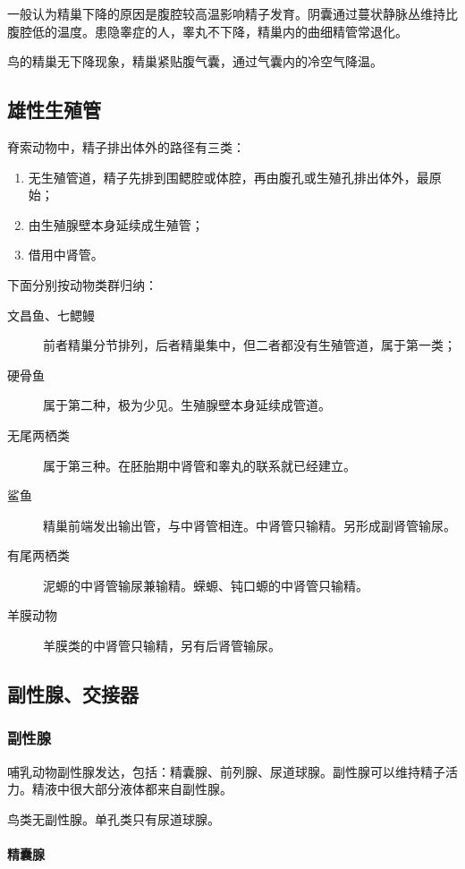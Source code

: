 一般认为精巢下降的原因是腹腔较高温影响精子发育。阴囊通过蔓状静脉丛维持比腹腔低的温度。患隐睾症的人，睾丸不下降，精巢内的曲细精管常退化。

鸟的精巢无下降现象，精巢紧贴腹气囊，通过气囊内的冷空气降温。

\subsection{雄性生殖管}

脊索动物中，精子排出体外的路径有三类：
\begin{enumerate}
	\item 无生殖管道，精子先排到围鳃腔或体腔，再由腹孔或生殖孔排出体外，最原始；
	\item 由生殖腺壁本身延续成生殖管；
	\item 借用中肾管。
\end{enumerate}

下面分别按动物类群归纳：
\begin{description}
	\item[文昌鱼、七鳃鳗] 前者精巢分节排列，后者精巢集中，但二者都没有生殖管道，属于第一类；
	\item[硬骨鱼] 属于第二种，极为少见。生殖腺壁本身延续成管道。
	\item[无尾两栖类] 属于第三种。在胚胎期中肾管和睾丸的联系就已经建立。
	\item[鲨鱼] 精巢前端发出输出管，与中肾管相连。中肾管只输精。另形成副肾管输尿。
	\item[有尾两栖类] 泥螈的中肾管输尿兼输精。蝾螈、钝口螈的中肾管只输精。
	\item[羊膜动物] 羊膜类的中肾管只输精，另有后肾管输尿。
\end{description}

\subsection{副性腺、交接器}

\subsubsection{副性腺}

哺乳动物副性腺发达，包括：精囊腺、前列腺、尿道球腺。副性腺可以维持精子活力。精液中很大部分液体都来自副性腺。

鸟类无副性腺。单孔类只有尿道球腺。

\paragraph{精囊腺}

